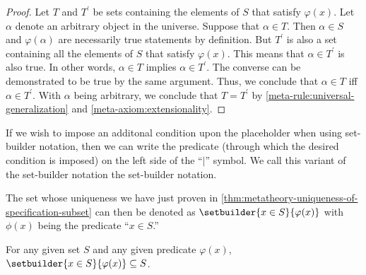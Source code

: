 \begin{proof}
    Let \( T \) and \( T^{\prime} \) be sets containing the elements of \( S \) that satisfy \( \varphi(x) \).
    Let \( \alpha \) denote an arbitrary object in the universe.
    Suppose that \( \alpha \in T \).
    Then \( \alpha \in S \) and \( \varphi(\alpha) \) are necessarily true statements by definition.
    But \( T^{\prime} \) is also a set containing all the elements of \( S \) that satisfy \( \varphi(x) \).
    This means that \( \alpha \in T^{\prime} \) is also true.
    In other words, \( \alpha \in T \) implies \( \alpha \in T^{\prime} \).
    The converse can be demonstrated to be true by the same argument.
    Thus, we conclude that \( \alpha \in T \) iff \( \alpha \in T^{\prime} \).
    With \( \alpha \) being arbitrary, we conclude that \( T = T^{\prime} \) by \cref{meta-rule:universal-generalization} and
    \cref{meta-axiom:extensionality}.
\end{proof}

\begin{notation}
    If we wish to impose an additonal condition upon the placeholder when using set-builder notation,
    then we can write the predicate (through which the desired condition is imposed) on the left side of the ``\( \vert \)'' symbol.
    We call this variant of the set-builder notation the  set-builder notation.
\end{notation}


\begin{eg}
    The set whose uniqueness we have just proven in \cref{thm:metatheory-uniqueness-of-specification-subset} can then be denoted as
    \( \setbuilder{x \in S}{\varphi(x)} \) with \( \phi(x) \) being the predicate ``\( x \in S \).''
\end{eg}

\begin{thm}
     \label{thm:metatheory-restricted-comprehension-set-is-the-subset-of-an-existing-set}
    For any given set \( S \) and any given predicate \( \varphi(x) \), \( \setbuilder{x \in S}{\varphi(x)} \subseteq S \).
\end{thm}

